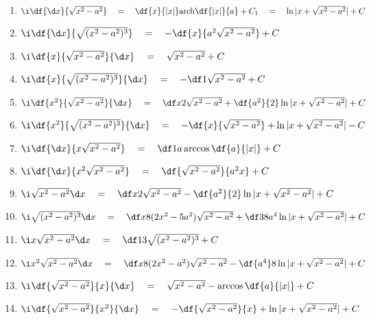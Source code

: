 \begin{enumerate}
\bigskip
{\bf （七）含有$\sqrt{x^2-a^2}\;(a>0)$的积分}\ps{$x=a\sec t$}
  \item $\i\df{{\d x}}{\sqrt{x^2-a^2}}\quad=\quad\df{x}{|x|}\mathrm{arch}\df{|x|}{a}+C_1
  \quad=\quad\ln|x+\sqrt{x^2-a^2}|+C$
  \item $\i\df{{\d x}}{\sqrt{(x^2-a^2)^3}}\quad=\quad-\df{x}{a^2\sqrt{x^2-a^2}}+C$
  \item $\i\df{x}{\sqrt{x^2-a^2}}{\d x}\quad=\quad\sqrt{x^2-a^2}+C$
  \item $\i\df{x}{\sqrt{(x^2-a^2)^3}}{\d x}\quad=\quad-\df 1{\sqrt{x^2-a^2}}+C$
  \item $\i\df{x^2}{\sqrt{x^2-a^2}}{\d x}\quad=\quad\df
  x2\sqrt{x^2-a^2}+\df{a^2}{2}\ln|x+\sqrt{x^2-a^2}|+C$
  \item $\i\df{x^2}{\sqrt{(x^2-a^2)^3}}{\d x}\quad=\quad-\df{x}{\sqrt{x^2-a^2}}
  +\ln|x+\sqrt{x^2-a^2}|-C$
  \item $\i\df{{\d x}}{x\sqrt{x^2-a^2}}\quad=\quad\df 1a\arccos\df{a}{|x|}+C$
  \item $\i\df{{\d x}}{x^2\sqrt{x^2-a^2}}\quad=\quad\df{\sqrt{x^2-a^2}}{a^2x}+C$
  \item $\i\sqrt{x^2-a^2}{\d x}\quad=\quad\df
  x2\sqrt{x^2-a^2}-\df{a^2}{2}\ln|x+\sqrt{x^2-a^2}|+C$
  \item $\i\sqrt{(x^2-a^2)^3}{\d x}\quad=\quad\df x8(2x^2-5a^2)\sqrt{x^2-a^2}
  +\df 38a^4\ln|x+\sqrt{x^2-a^2}|+C$
  \item $\i x\sqrt{x^2-a^2}{\d x}\quad=\quad\df 13\sqrt{(x^2-a^2)^3}+C$
  \item $\i x^2\sqrt{x^2-a^2}{\d x}\quad=\quad\df x8(2x^2-a^2)\sqrt{x^2-a^2}
  -\df{a^4}8\ln|x+\sqrt{x^2-a^2}|+C$
  \item $\i\df{\sqrt{x^2-a^2}}{x}{\d x}\quad=\quad\sqrt{x^2-a^2}-\arccos\df{a}{|x|}+C$
  \item $\i\df{\sqrt{x^2-a^2}}{x^2}{\d x}\quad=\quad-\df{\sqrt{x^2-a^2}}{x}
  +\ln|x+\sqrt{x^2-a^2}|+C$


\end{enumerate}
